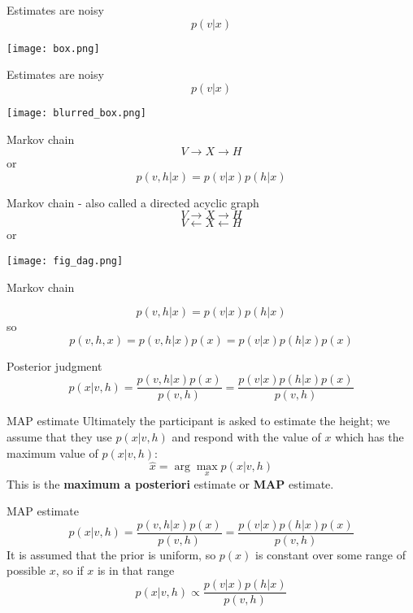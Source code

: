 \documentclass{beamer}
\newcommand{\crish}{\color{reddish}}
\newcommand{\cbla}{\color{black}}
\begin{document}
\begin{frame}{Estimates are noisy}
\crish$$p(v|x)$$\cbla{} 
  \begin{center}
\texttt{[image: box.png]}
\end{center}
\end{frame}


\begin{frame}{Estimates are noisy}
\crish$$p(v|x)$$\cbla{} 
  \begin{center}
\texttt{[image: blurred\_box.png]}
\end{center}
\end{frame}

\begin{frame}{Markov chain}
\crish$$
V\rightarrow X\rightarrow H
$$\cbla{}
or
\crish$$
p(v,h|x)=p(v|x)p(h|x)
$$\cbla{}
\end{frame}


\begin{frame}{Markov chain - also called a directed acyclic graph}
\crish$$
V\rightarrow X\rightarrow H
$$\cbla{}
\crish$$
V\leftarrow X\leftarrow H
$$\cbla{}
or
\begin{center}
  \texttt{[image: fig\_dag.png]}
\end{center}
\end{frame}


\begin{frame}{Markov chain}

\crish$$
p(v,h|x)=p(v|x)p(h|x)
$$\cbla{}
so
\crish$$
p(v,h,x)=p(v,h|x)p(x)=p(v|x)p(h|x)p(x)
$$\cbla{}
\end{frame}

\begin{frame}{Posterior judgment}
  \crish$$
  p(x|v,h)=\frac{p(v,h|x)p(x)}{p(v,h)}=\frac{p(v|x)p(h|x)p(x)}{p(v,h)}
  $$\cbla{}
\end{frame}

\begin{frame}{MAP estimate}
  Ultimately the participant is asked to estimate the height; we
  assume that they use \crish$p(x|v,h)$\cbla{} and respond with the
  value of \crish$x$\cbla{} which has the maximum value of
  \crish$p(x|v,h)$\cbla{}:
  \crish$$
  \hat{x}=\arg\max_x{p(x|v,h)}
  $$\cbla{}
  This is the \textbf{maximum a posteriori} estimate or \textbf{MAP} estimate.
\end{frame}

\begin{frame}{MAP estimate}
  \crish$$
p(x|v,h)=\frac{p(v,h|x)p(x)}{p(v,h)}=\frac{p(v|x)p(h|x)p(x)}{p(v,h)}
$$\cbla{}
It is assumed that the prior is uniform, so \crish$p(x)$\cbla{} is constant over some range of possible \crish$x$\cbla{}, so if \crish$x$\cbla{} is in that range
\crish$$
p(x|v,h)\propto \frac{p(v|x)p(h|x)}{p(v,h)}
$$\cbla{}
\end{frame}
\end{document}
